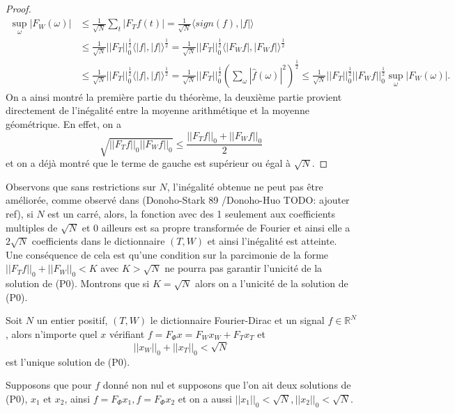 \begin{exemple}
\begin{proof}
		\begin{align}
			\sup_\omega|F_W(\omega)| &\leq \frac{1}{\sqrt{N}}\sum_t |F_Tf (t)| = \frac{1}{\sqrt{N}}\langle sign(f), |f| \rangle \\
			&\leq  \frac{1}{\sqrt{N}} ||F_T||_0^{\frac{1}{2}} \langle |f|, |f| \rangle ^{\frac{1}{2}} =  \frac{1}{\sqrt{N}} ||F_T||_0^{\frac{1}{2}} \langle |F_W f|, |F_Wf| \rangle ^{\frac{1}{2}} \\
			&\leq   \frac{1}{\sqrt{N}} ||F_T||_0^{\frac{1}{2}} \langle |f|, |f| \rangle ^{\frac{1}{2}} =  \frac{1}{\sqrt{N}} ||F_T||_0^{\frac{1}{2}} \left( \sum_\omega|\hat{f}(\omega)|^2 \right)^{\frac{1}{2}} \leq \frac{1}{\sqrt{N}}||F_T||_0^{\frac{1}{2}} ||F_W f||_0^{\frac{1}{2}} \sup_\omega |F_W(\omega)|.
		\end{align}
		On a ainsi montré la première partie du théorème, la deuxième partie provient directement de l'inégalité entre la moyenne arithmétique et la moyenne géométrique.
		En effet, on a 
		\begin{equation}
			\sqrt{||F_T f||_0 ||F_W f||_0} \leq \frac{||F_T f||_0 + ||F_W f||_0}{2}
		\end{equation}
	et on a déjà montré que le terme de gauche est supérieur ou égal à $\sqrt{N}$.
	\end{proof}
	Observons que sans restrictions sur $N$, l'inégalité obtenue ne peut pas être améliorée, comme observé dans (Donoho-Stark 89 /Donoho-Huo TODO: ajouter ref), si $N$ est un carré, alors, la fonction avec des 1 seulement aux coefficients multiples de $\sqrt{N}$ et 0 ailleurs est sa propre transformée de Fourier et ainsi elle a $2\sqrt{N}$ coefficients dans le dictionnaire $(T,W)$ et ainsi l'inégalité est atteinte.
	Une conséquence de cela est qu'une condition sur la parcimonie de la forme $||F_T f||_0 + ||F_W||_0 < K$ avec $K>\sqrt{N}$ ne pourra pas garantir l'unicité de la solution de (P0).
	Montrons que si $K = \sqrt{N}$ alors on a l'unicité de la solution de (P0).
	\begin{theoreme}\label{th:Incert2}
		Soit $N$ un entier positif, $(T,W)$ le dictionnaire Fourier-Dirac et un signal $f \in \mathbb{R}^N$, alors n'importe quel $x$ vérifiant $f = F_\Phi x = F_W x_W + F_T x_T$ et 
		\begin{equation}\label{eq:Incert1}
			||x_W||_0 + ||x_T||_0 < \sqrt{N}
		\end{equation}
		est l'unique solution de (P0).
	\end{theoreme}
	Supposons que pour $f$ donné non nul et supposons que l'on ait deux solutions de (P0), $x_1$ et $x_2$, ainsi $f = F_\Phi x_1, f = F_\Phi x_2$ et on a aussi $||x_1||_0 < \sqrt{N}, ||x_2||_0 < \sqrt{N}$.

\end{exemple}
